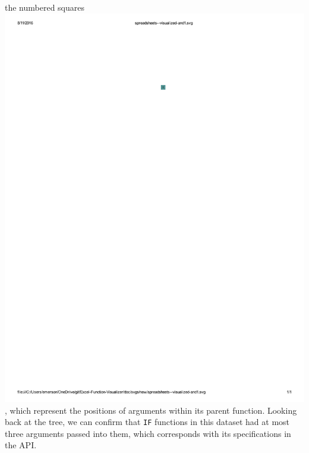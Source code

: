 \documentclass[conference]{IEEEtran}
\begin{document}
	the numbered squares \includegraphics{glossary-blue}, which represent the
	positions of arguments within its parent function. Looking back at the tree, we
	can confirm that \texttt{IF} functions in this dataset had at most three arguments
	passed into them, which corresponds with its specifications in the API. 
	
\end{document}

